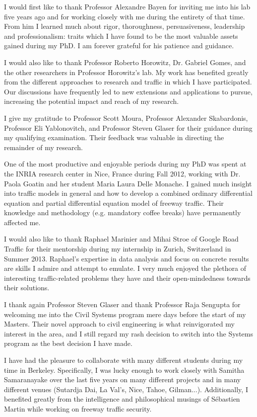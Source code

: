 I would first like to thank Professor Alexandre Bayen for inviting me into his lab five years ago and for working closely with me during the entirety of that time. From him I learned much about rigor, thoroughness, persuasiveness, leadership and professionalism: traits which I have found to be the most valuable assets gained during my PhD. I am forever grateful for his patience and guidance.

I would also like to thank Professor Roberto Horowitz, Dr. Gabriel Gomes, and the other researchers in Professor Horowitz's lab. My work has benefited greatly from the different approaches to research and traffic in which I have participated. Our discussions have frequently led to new extensions and applications to pursue, increasing the potential impact and reach of my research.

I give my gratitude to Professor Scott Moura, Professor Alexander Skabardonis, Professor Eli Yablonovitch, and Professor Steven Glaser for their guidance during my qualifying examination. Their feedback was valuable in directing the remainder of my research.


One of the most productive and enjoyable periods during my PhD was spent at the INRIA research center in Nice, France during Fall 2012, working with Dr. Paola Goatin and her student Maria Laura Delle Monache. I gained much insight into traffic models in general and how to develop a combined ordinary differential equation and partial differential equation model of freeway traffic. Their knowledge and methodology (e.g. mandatory coffee breaks) have permanently affected me.

I would also like to thank Raphael Marinier and Mihai Stroe of Google Road Traffic for their mentorship during my internship in Zurich, Switzerland in Summer 2013. Raphael's expertise in data analysis and focus on concrete results are skills I admire and attempt to emulate. I very much enjoyed the plethora of interesting traffic-related problems they have and their open-mindedness towards their solutions.

I thank again Professor Steven Glaser and thank Professor Raja Sengupta for welcoming me into the Civil Systems program mere days before the start of my Masters. Their novel approach to civil engineering is what reinvigorated my interest in the area, and I still regard my rash decision to switch into the Systems program as the best decision I have made.

I have had the pleasure to collaborate with many different students during my time in Berkeley. Specifically, I was lucky enough to work closely with Samitha Samaranayake over the last five years on many different projects and in many different venues (Sutardja Dai, La Val's, Nice, Tahoe, Gilman...). Additionally, I benefited greatly from the intelligence and philosophical musings of S\'{e}bastien Martin while working on freeway traffic security.

